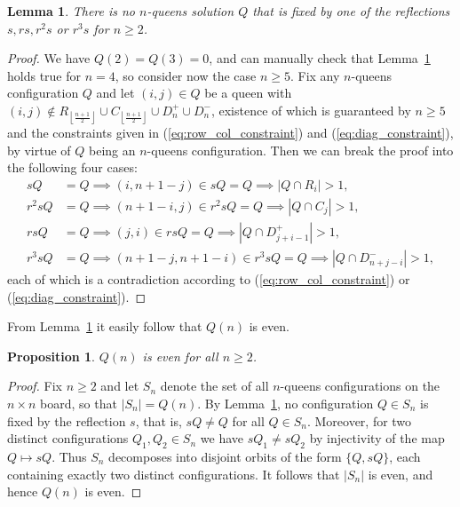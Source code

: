 \documentclass[pdflatex,sn-mathphys-num]{sn-jnl}
\theoremstyle{thmstyleone}
\newtheorem{proposition}[theorem]{Proposition}
\newtheorem{lemma}[theorem]{Lemma}
\theoremstyle{thmstyletwo}
\theoremstyle{thmstylethree}
\begin{document}
\begin{lemma}\label{lem:no-s-symmetry}
    There is no $n$-queens solution $Q$ that is fixed by one of the reflections $s, rs, r^2s$ or $r^3s$ for $n \geq 2$. 
\end{lemma}
\begin{proof}
    We have $Q(2) = Q(3) = 0$, and can manually check that Lemma~\ref{lem:no-s-symmetry} holds true for $n = 4$, 
    so consider now the case $n \geq 5$. Fix any $n$-queens configuration $Q$ and let $(i,j) \in Q$ be a queen with 
    $(i,j) \notin R_{\left\lfloor \frac{n+1}{2} \right\rfloor} \cup C_{\left\lfloor \frac{n+1}{2} \right\rfloor} \cup D_n^+ \cup D_n^-$, existence 
    of which is guaranteed by $n \geq 5$ and the constraints given in (\ref{eq:row_col_constraint}) and (\ref{eq:diag_constraint}), by virtue 
    of $Q$ being an $n$-queens configuration. Then we can break the proof into the following four cases:
    \begin{align}
        sQ &= Q \implies (i, n+1-j) \in sQ = Q \implies |Q \cap R_i| > 1, \\
        r^2sQ &= Q \implies (n+1-i, j) \in r^2sQ = Q \implies |Q \cap C_j| > 1, \\
        rsQ &= Q \implies (j, i) \in rsQ = Q \implies |Q \cap D_{j+i-1}^{+}| > 1, \\
        r^3sQ &= Q \implies (n+1-j, n+1-i) \in r^3sQ = Q \implies |Q \cap D_{n+j-i}^{-}| > 1,
    \end{align}
    each of which is a contradiction according to (\ref{eq:row_col_constraint}) or (\ref{eq:diag_constraint}).
\end{proof}
From Lemma~\ref{lem:no-s-symmetry} it easily follow that $Q(n)$ is even.
\begin{proposition} \label{cor:Qn_even}
    $Q(n)$ is even for all $n \geq 2$.
\end{proposition}
\begin{proof}
    Fix $n \geq 2$ and let $S_n$ denote the set of all $n$-queens configurations on the $n \times n$ board, so that
    $\lvert S_n \rvert = Q(n)$.
    By Lemma~\ref{lem:no-s-symmetry}, no configuration $Q \in S_n$ is fixed by the reflection $s$, that is, $sQ \neq Q$ for all
    $Q \in S_n$. Moreover, for two distinct configurations $Q_1, Q_2 \in S_n$ we have $sQ_1 \neq sQ_2$ 
    by injectivity of the map $Q \mapsto sQ$.
    Thus $S_n$ decomposes into disjoint orbits of the form $\{Q, sQ\}$, each containing exactly two distinct
    configurations. It follows that $\lvert S_n \rvert$ is even, and hence $Q(n)$ is even.
\end{proof}
\end{document}
